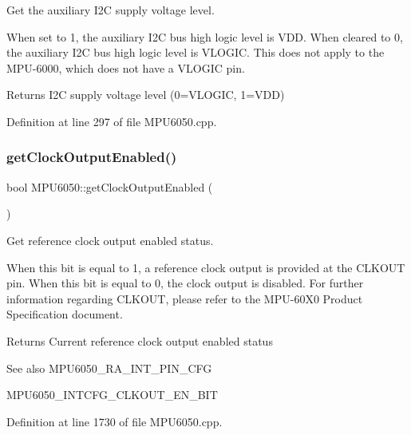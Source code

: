 Get the auxiliary I2C supply voltage level. 

When set to 1, the auxiliary I2C bus high logic level is V\+DD. When cleared to 0, the auxiliary I2C bus high logic level is V\+L\+O\+G\+IC. This does not apply to the M\+P\+U-\/6000, which does not have a V\+L\+O\+G\+IC pin. \begin{DoxyReturn}{Returns}
I2C supply voltage level (0=V\+L\+O\+G\+IC, 1=V\+DD) 
\end{DoxyReturn}


Definition at line 297 of file M\+P\+U6050.\+cpp.

\mbox{\label{classMPU6050_ada96c33957bf20c04ca598a3537358ef}} 
\subsubsection{\texorpdfstring{getClockOutputEnabled()}{getClockOutputEnabled()}}
{\footnotesize\ttfamily bool M\+P\+U6050\+::get\+Clock\+Output\+Enabled (\begin{DoxyParamCaption}{ }\end{DoxyParamCaption})}



Get reference clock output enabled status. 

When this bit is equal to 1, a reference clock output is provided at the C\+L\+K\+O\+UT pin. When this bit is equal to 0, the clock output is disabled. For further information regarding C\+L\+K\+O\+UT, please refer to the M\+P\+U-\/60\+X0 Product Specification document. \begin{DoxyReturn}{Returns}
Current reference clock output enabled status 
\end{DoxyReturn}
\begin{DoxySeeAlso}{See also}
M\+P\+U6050\+\_\+\+R\+A\+\_\+\+I\+N\+T\+\_\+\+P\+I\+N\+\_\+\+C\+FG 

M\+P\+U6050\+\_\+\+I\+N\+T\+C\+F\+G\+\_\+\+C\+L\+K\+O\+U\+T\+\_\+\+E\+N\+\_\+\+B\+IT 
\end{DoxySeeAlso}


Definition at line 1730 of file M\+P\+U6050.\+cpp.

\mbox{\label{classMPU6050_a8ed670258a805807b5102cdc5d0996a8}} 
